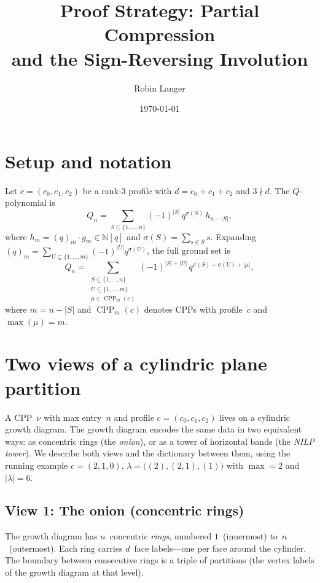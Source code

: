 \documentclass[11pt]{article}
\title{Proof Strategy: Partial Compression\\
  and the Sign-Reversing Involution}
\author{Robin Langer}
\date{\today}
\newcommand{\N}{\mathbb{N}}
\newcommand{\CPP}{\operatorname{CPP}}
\theoremstyle{plain}
\theoremstyle{definition}
\begin{document}
\maketitle


\section{Setup and notation}

Let $c = (c_0, c_1, c_2)$ be a rank-3 profile with
$d = c_0 + c_1 + c_2$ and $3 \nmid d$.
The $Q$-polynomial is
\[
  Q_n = \sum_{S \subseteq \{1,\ldots,n\}}
    (-1)^{|S|}\, q^{\sigma(S)}\, h_{n-|S|},
\]
where $h_m = (q)_m \cdot g_m \in \N[q]$ and
$\sigma(S) = \sum_{s \in S} s$.
Expanding $(q)_m = \sum_{U \subseteq \{1,\ldots,m\}}
(-1)^{|U|} q^{\sigma(U)}$, the full ground set is
\[
  Q_n = \sum_{\substack{S \subseteq \{1,\ldots,n\} \\
    U \subseteq \{1,\ldots,m\} \\ \mu \in \CPP_m(c)}}
    (-1)^{|S|+|U|}\, q^{\sigma(S) + \sigma(U) + |\mu|},
\]
where $m = n - |S|$ and $\CPP_m(c)$ denotes CPPs with
profile~$c$ and $\max(\mu) = m$.


\section{Two views of a cylindric plane partition}
\label{sec:two-views}

A CPP~$\nu$ with max entry~$n$ and profile $c = (c_0, c_1, c_2)$
lives on a cylindric growth diagram.  The growth diagram encodes
the same data in two equivalent ways: as concentric rings
(the \emph{onion}), or as a tower of horizontal bands
(the \emph{NILP tower}).  We describe both views and the
dictionary between them, using the running example
$c = (2,1,0)$, $\lambda = \bigl((2),(2,1),(1)\bigr)$
with $\max = 2$ and $|\lambda| = 6$.


\subsection{View 1: The onion (concentric rings)}

The growth diagram has $n$~concentric \emph{rings}, numbered
$1$~(innermost) to~$n$~(outermost).  Each ring carries
$d$~face labels---one per face around the cylinder.  The
boundary between consecutive rings is a triple of partitions
(the vertex labels of the growth diagram at that level).
\end{document}
